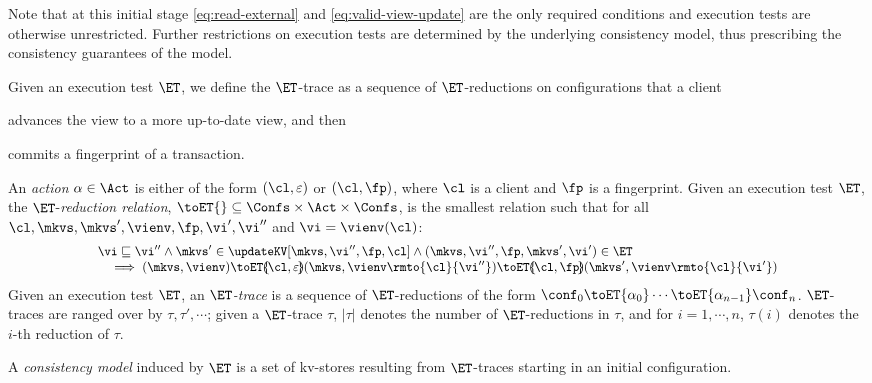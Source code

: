 Note that at this initial stage \eqref{eq:read-external} and \eqref{eq:valid-view-update} are the only required conditions and execution tests are otherwise unrestricted. 
Further restrictions on execution tests are determined by the underlying consistency model, thus prescribing the consistency guarantees of the model.

Given an execution test  $\ET$, we define the $\ET$-trace as a sequence of $\ET$-reductions on configurations that a client
\begin{enumerate*}
	\item advances the view to a more up-to-date view, and then
	\item commits a fingerprint of a transaction. 
\end{enumerate*}

\begin{definition}[$\ET$-trace]
\label{def:reduction}
An \emph{action} $\alpha \in \Act$ is either of the form $(\cl, \varepsilon)$ or $(\cl, \fp)$, 
where $\cl$ is a client and $\fp$ is a fingerprint. 
Given an execution test $\ET$, the $\ET$-\emph{reduction relation},
$\toET{} \subseteq \Confs \times \Act \times \Confs$, 
is the smallest relation such that for all $\cl, \mkvs, \mkvs', \vienv, \fp, \vi', \vi''$ and $\vi = \vienv(\cl)$:
%
{
\[
\small
\begin{array}{@{}l@{}}
    \vi \sqsubseteq \vi'' 
    \land \mkvs' \in \updateKV[\mkvs, \vi'', \fp, \cl]
    \land (\mkvs, \vi'', \fp, \mkvs', \vi') \in \ET \\
    \quad \implies
    (\mkvs, \vienv) \toET{\hspace{-5pt}(\cl, \varepsilon)\hspace{-5pt}} 
    (\mkvs, \vienv\rmto{\cl}{\vi''}) \toET{\hspace{-5pt}(\cl,\fp)\hspace{-5pt}} (\mkvs', \vienv\rmto{\cl}{\vi'})
\end{array}
\]
}
%
Given an execution test $\ET$, an \emph{$\ET$-trace} is a sequence of $\ET$-reductions of the form $\conf_{0} \toET{\alpha_{0}} \cdots \toET{\alpha_{n-1}} \conf_{n}$. $\ET$-traces are ranged over by $\tau, \tau', \cdots$; 
given a $\ET$-trace $\tau$, $\lvert \tau \rvert$ denotes the number of $\ET$-reductions in $\tau$, and 
for $i=1,\cdots,n$, $\tau(i)$ denotes the $i$-th reduction of $\tau$.
\end{definition}

A \emph{consistency model} induced by $\ET$ is a set of kv-stores
resulting from $\ET$-traces starting in an 
initial configuration. 


